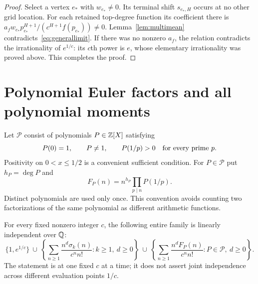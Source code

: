 \begin{proof}
Select a vertex $e_*$ with $w_{e_*}\ne0$. Its terminal shift
$s_{e_*,H}$ occurs at no other grid location. For each retained
top-degree function its coefficient there is
$a_fw_{e_*}p_{e_*}^{H+1}/(c^{H+1}f(p_{e_*}))\ne0$.
Lemma~\ref{lem:multimean} contradicts~\eqref{eq:generallimit}.
If there was no nonzero $a_f$, the relation contradicts the
irrationality of $e^{1/c}$: its $c$th power is $e$, whose elementary
irrationality was proved above. This completes the proof.
\end{proof}

\section{Polynomial Euler factors and all polynomial moments}
\label{sec:eulerpolynomials}
Let $\mathcal P$ consist of polynomials $P\in\mathbb Z[X]$ satisfying
\begin{equation}\label{eq:admissibleP}
 P(0)=1,\qquad P\ne1,\qquad P(1/p)>0
 \quad\hbox{for every prime }p.
\end{equation}
Positivity on $0<x\leq1/2$ is a convenient sufficient condition.
For $P\in\mathcal P$ put $h_P=\deg P$ and
\begin{equation}\label{eq:FP}
 F_P(n)=n^{h_P}\prod_{p\mid n}P(1/p).
\end{equation}
Distinct polynomials are used only once. This convention avoids
counting two factorizations of the same polynomial as different
arithmetic functions.

\begin{theorem}
\label{thm:allmoments}
For every fixed nonzero integer $c$, the following entire family is
linearly independent over $\mathbb Q$:
\begin{equation}\label{eq:allmoments}
 \{1,e^{1/c}\}\ \cup\
 \left\{\sum_{n\geq1}\frac{n^d\sigma_k(n)}{c^n n!}:
                     k\geq1,\ d\geq0\right\}
 \ \cup\
 \left\{\sum_{n\geq1}\frac{n^dF_P(n)}{c^n n!}:
                     P\in\mathcal P,\ d\geq0\right\}.
\end{equation}
The statement is at one fixed $c$ at a time; it does not assert joint
independence across different evaluation points $1/c$.
\end{theorem}


